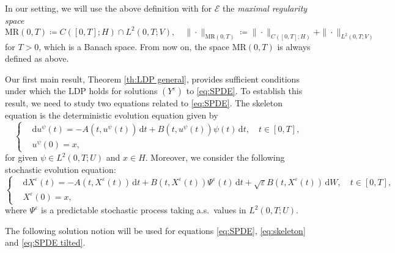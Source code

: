 \documentclass{amsart}
\newcommand{\dd}{\,\mathrm{d}}
\newcommand{\ddd}{\mathrm{d}}
\renewcommand{\MR}{\mathrm{MR}}
\newcommand{\<}{\langle}
\newcommand{\?}{\rangle}
\newcommand{\bphieps}{\Psi^{\eps}}
\theoremstyle{plain}
\theoremstyle{remark}
\theoremstyle{plain}
\numberwithin{equation}{section}
\newcommand{\eps}{\varepsilon}
\begin{document}
In our setting, we will use the above definition with for $\mathcal{E}$ the \emph{maximal regularity space} 
\begin{equation}\label{eq: def MR space}
    \MR(0,T)\coloneqq C([0,T];H)\cap L^2(0,T;V), \quad \|\cdot\|_{\MR(0,T)}\coloneqq \|\cdot\|_{C([0,T];H)}+\|\cdot\|_{L^2(0,T;V)}
\end{equation}
for $T>0$, which is a Banach space. From now on, the space $\MR(0,T)$ is always defined as above.

Our first main result, Theorem \ref{th:LDP general}, provides sufficient conditions under which the LDP holds for solutions $(Y^\eps)$ to \eqref{eq:SPDE}. To establish this result, we need to study two equations related to \eqref{eq:SPDE}. 
The skeleton equation is the deterministic evolution equation given by 
\begin{equation}\label{eq:skeleton}
   \begin{cases}
  &\ddd u^\psi(t)=-A(t,u^\psi(t))\dd t+B(t,u^\psi(t))\psi(t)\dd t, \quad t\in[0,T], \\
  &u^\psi(0)=x,
\end{cases}
\end{equation} 
for given $\psi\in L^2(0,T;U)$ and $x\in H$. 
Moreover, we consider the following stochastic evolution equation:
\begin{equation}\label{eq:SPDE tilted}
   \begin{cases}
  &\ddd X^\eps(t)=-A(t,X^\eps(t))\dd t+B(t,X^\eps(t))\bphieps(t)\dd t+\sqrt{\eps}B(t,X^\eps(t))\dd W, \quad t\in[0,T], \\
  &X^\eps(0)=x,
\end{cases}
\end{equation} 
where $\bphieps$ is  a predictable stochastic process taking a.s.\ values in $L^2(0,T;U)$. 

The following solution notion will be used for equations \eqref{eq:SPDE}, \eqref{eq:skeleton} and \eqref{eq:SPDE tilted}. 
\end{document}
